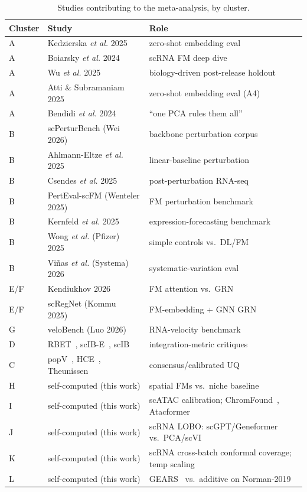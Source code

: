 \documentclass[11pt]{article}
\begin{document}
\begin{table}[htbp]\centering\small
\caption{Studies contributing to the meta-analysis, by cluster.}
\label{tab:corpus}
\begin{tabular}{@{}lll@{}}
\toprule
Cluster & Study & Role \\
\midrule
A & Kedzierska \emph{et al.} 2025~\cite{kedzierska2025} & zero-shot embedding eval \\
A & Boiarsky \emph{et al.} 2024~\cite{boiarsky2024} & scRNA FM deep dive \\
A & Wu \emph{et al.} 2025~\cite{wu2025} & biology-driven post-release holdout \\
A & Atti \& Subramaniam 2025~\cite{atti2025} & zero-shot embedding eval (A4) \\
A & Bendidi \emph{et al.} 2024~\cite{bendidi2024} & ``one PCA rules them all'' \\
B & scPerturBench (Wei 2026)~\cite{scperturbench2025} & backbone perturbation corpus \\
B & Ahlmann-Eltze \emph{et al.} 2025~\cite{ahlmann2025} & linear-baseline perturbation \\
B & Csendes \emph{et al.} 2025~\cite{csendes2025} & post-perturbation RNA-seq \\
B & PertEval-scFM (Wenteler 2025)~\cite{perteval2024} & FM perturbation benchmark \\
B & Kernfeld \emph{et al.} 2025~\cite{kernfeld2025} & expression-forecasting benchmark \\
B & Wong \emph{et al.} (Pfizer) 2025~\cite{wongpfizer2025} & simple controls vs.\ DL/FM \\
B & Vi{\~n}as \emph{et al.} (Systema) 2026~\cite{systema2026} & systematic-variation eval \\
E/F & Kendiukhov 2026~\cite{kendiukhov2026} & FM attention vs.\ GRN \\
E/F & scRegNet (Kommu 2025)~\cite{scregnet2025} & FM-embedding + GNN GRN \\
G & veloBench (Luo 2026)~\cite{velobench2026} & RNA-velocity benchmark \\
D & RBET~\cite{rbet2025}, scIB-E~\cite{scibe2025}, scIB~\cite{luecken2022} & integration-metric critiques \\
C & popV~\cite{popv2024}, HCE~\cite{hce2026}, Theunissen~\cite{theunissen2024} & consensus/calibrated UQ \\
H & self-computed (this work) & spatial FMs vs.\ niche baseline \\
I & self-computed (this work) & scATAC calibration; ChromFound~\cite{chromfound2025}, Atacformer~\cite{atacformer2024} \\
J & self-computed (this work) & scRNA LOBO: scGPT/Geneformer vs.\ PCA/scVI~\cite{lopez2018} \\
K & self-computed (this work) & scRNA cross-batch conformal coverage; temp scaling~\cite{guo2017} \\
L & self-computed (this work) & GEARS~\cite{roohani2024} vs.\ additive on Norman-2019~\cite{norman2019} \\
\bottomrule
\end{tabular}
\end{table}
\end{document}
